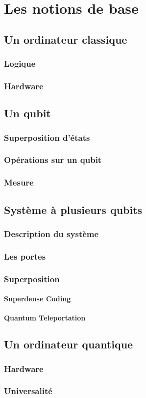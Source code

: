 \part{Les notions de base}
\chapter{Un ordinateur classique}
\section{Logique}

\section{Hardware}

\chapter{Un qubit}
\section{Superposition d'états}

\section{Opérations sur un qubit}

\section{Mesure}

\chapter{Système à plusieurs qubits}
\section{Description du système}

\section{Les portes}

\section{Superposition}

\subsection{Superdense Coding}

\subsection{Quantum Teleportation}

\chapter{Un ordinateur quantique}

\section{Hardware}

\section{Universalité}